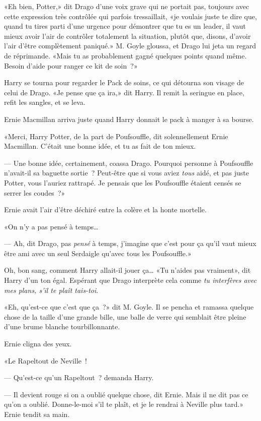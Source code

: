 «Eh bien, Potter,» dit Drago d'une voix grave qui ne portait pas, toujours avec cette expression très contrôlée qui parfois tressaillait, «je voulais juste te dire que, quand tu tires parti d'une urgence pour démontrer que tu es un leader, il vaut mieux avoir l'air de contrôler totalement la situation, plutôt que, disons, d'avoir l'air d'être complètement paniqué.» M. Goyle gloussa, et Drago lui jeta un regard de réprimande. «Mais tu as probablement gagné quelques points quand même. Besoin d'aide pour ranger ce kit de soin~?»

Harry se tourna pour regarder le Pack de soins, ce qui détourna son visage de celui de Drago. «Je pense que ça ira,» dit Harry. Il remit la seringue en place, refit les sangles, et se leva.

Ernie Macmillan arriva juste quand Harry donnait le pack à manger à sa bourse.

«Merci, Harry Potter, de la part de Poufsouffle, dit solennellement Ernie Macmillan. C'était une bonne idée, et tu as fait de ton mieux.

--- Une bonne idée, certainement, coassa Drago. Pourquoi personne à Poufsouffle n'avait-il sa baguette sortie~? Peut-être que si vous aviez \emph{tous} aidé, et pas juste Potter, vous l'auriez rattrapé. Je pensais que les Poufsouffle étaient censés se serrer les coudes~?»

Ernie avait l'air d'être déchiré entre la colère et la honte mortelle.

«On n'y a pas pensé à temps…

--- Ah, dit Drago, pas \emph{pensé} à temps, j'imagine que c'est pour ça qu'il vaut mieux être ami avec un seul Serdaigle qu'avec tous les Poufsouffle.»

Oh, bon sang, comment Harry allait-il jouer ça… «Tu n'aides pas vraiment», dit Harry d'un ton égal. Espérant que Drago interprète cela comme \emph{tu interfères avec mes plans, s'il te plaît tais-toi}.

«Eh, qu'est-ce que c'est que ça~?» dit M. Goyle. Il se pencha et ramassa quelque chose de la taille d'une grande bille, une balle de verre qui semblait être pleine d'une brume blanche tourbillonnante.

Ernie cligna des yeux.

«Le Rapeltout de Neville~!

--- Qu'est-ce qu'un Rapeltout~? demanda Harry.

--- Il devient rouge si on a oublié quelque chose, dit Ernie. Mais il ne dit pas ce qu'on a oublié. Donne-le-moi s'il te plaît, et je le rendrai à Neville plus tard.» Ernie tendit sa main.

